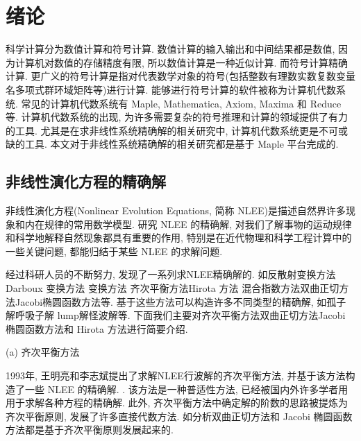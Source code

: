 \chapter{绪论} \label{ch01}
科学计算分为数值计算和符号计算. 数值计算的输入输出和中间结果都是数值, 因为计算机对数值的存储精度有限, 所以数值计算是一种近似计算. 而符号计算精确计算. 更广义的符号计算是指对代表数学对象的符号(包括整数\D 有理数\D 实数\D 复数\D 变量名\D 多项式\D 群\D 环\D 域\D 矩阵等)进行计算. 能够进行符号计算的软件被称为计算机代数系统. 常见的计算机代数系统有 Maple, Mathematica, Axiom, Maxima 和 Reduce 等. 计算机代数系统的出现, 为许多需要复杂的符号推理和计算的领域提供了有力的工具. 尤其是在求非线性系统精确解的相关研究中, 计算机代数系统更是不可或缺的工具. 本文对于非线性系统精确解的相关研究都是基于 Maple 平台完成的. 

\section{非线性演化方程的精确解}
非线性演化方程(Nonlinear Evolution Equations, 简称 NLEE)是描述自然界许多现象和内在规律的常用数学模型. 研究 NLEE 的精确解, 对我们了解事物的运动规律和科学地解释自然现象都具有重要的作用, 特别是在近代物理和科学工程计算中的一些关键问题, 都能归结于某些 NLEE 的求解问题. 

经过科研人员的不断努力, 发现了一系列求NLEE精确解的. 如反散射变换方法\cite{kawata1978inverse}\D Darboux 变换方法 \cite{matveev1991darboux}\D \Backlund{}变换方法 \cite{wahlquist1973backlund}\D 齐次平衡方法\cite{zhibin1993travelling}\D Hirota 方法 \cite{hirota1971exact}\D 混合指数方法\cite{hereman1986exact}\D 双曲正切方法\cite{malfliet1992solitary}\D Jacobi椭圆函数方法\cite{liu2001jacobi}等. 基于这些方法可以构造许多不同类型的精确解, 如孤子解\cite{hirota1971exact}\D 呼吸子解 \cite{tajiri1989breather}\D lump解\cite{satsuma1979two}\D 怪波解\cite{guo2011rogue}等. 下面我们主要对齐次平衡方法\D 双曲正切方法\D Jacobi 椭圆函数方法和 Hirota 方法进行简要介绍. 

(a) 齐次平衡方法

1993年, 王明亮和李志斌\cite{zhibin1993travelling}提出了求解NLEE行波解的齐次平衡方法, 并基于该方法构造了一些 NLEE 的精确解\cite{wang1995solitary,wang1996application}. . 该方法是一种普适性方法, 已经被国内外许多学者用用于求解各种方程的精确解\cite{hbm1998,senthilvelan2001extended,zhao2002new,rady2010homogeneous,nguyen2015modified}. 此外, 齐次平衡方法中确定解的阶数的思路被提炼为齐次平衡原则, 发展了许多直接代数方法. 如\Painleve{}分析\D 双曲正切方法和 Jacobi 椭圆函数方法都是基于齐次平衡原则发展起来的. 

